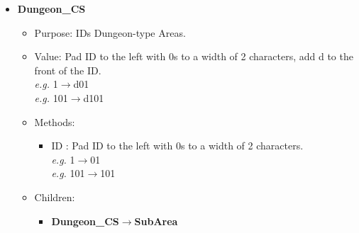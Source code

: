 \documentclass{article}
\begin{document}
\begin{itemize}
	\item \textbf{Dungeon\_CS}
	\begin{itemize}
		\item Purpose: IDs Dungeon-type Areas.
		\item Value: Pad ID to the left with 0s to a width of 2 characters, add d to the front of the ID.\\
		\textit{e.g.} 1$\rightarrow$d01\\
		\textit{e.g.} 101$\rightarrow$d101
		\item Methods:
		\begin{itemize}
			\item ID : Pad ID to the left with 0s to a width of 2 characters.\\
			\textit{e.g.} 1$\rightarrow$01\\
			\textit{e.g.} 101$\rightarrow$101
		\end{itemize}
		\item Children:
		\begin{itemize}
			\item \textbf{Dungeon\_CS}$\rightarrow$\textbf{SubArea}
		\end{itemize}
	\end{itemize}
	

\end{itemize}
\end{document}
